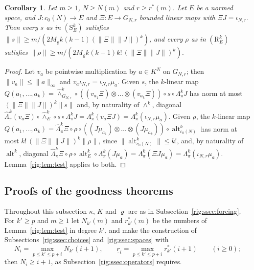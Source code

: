 \documentclass[11pt]{amsart}
\newtheorem{corollary}[theorem]{Corollary}
\theoremstyle{definition}
\theoremstyle{remark}
\numberwithin{equation}{section}
\newcommand{\norm}[1]{\lVert #1\rVert}
\theoremstyle{plain}
\theoremstyle{definition}
\theoremstyle{plain}
\newcommand{\alt}{\operatorname{alt}}
\begin{document}
\begin{corollary}\label{rig:cor:readout}
Let $m\ge1$, $N\ge N(m)$ and $r\ge r^*(m)$. Let $E$ be a normed space, and $J\colon c_0(N)\to E$ and
$\Xi\colon E\to G_{N,r}$ bounded linear maps with $\Xi J=\iota_{N,r}$. Then every $s$ as in $(\mathrm S^k_E)$ satisfies
$\norm s\ge m/(2M_\varrho k(k-1)(\norm\Xi\norm J)^k)$, and every $\rho$ as in $(\mathrm R^k_E)$ satisfies
$\norm\rho\ge m/(2M_\varrho k(k-1)k!\,(\norm\Xi\norm J)^k)$.
\end{corollary}

\begin{proof}
Let $v_a$ be pointwise multiplication by $a\in K^N$ on $G_{N,r}$; then $\norm{v_a}\le\norm a_\infty$ and
$v_a\iota_{N,r}=\iota_{N,r}\mu_a$. Given $s$, the $k$\nobreakdash-linear map
$Q(a_1,\dots,a_k)=\widehat\wedge^k_{G_{N,r}}\circ((v_{a_1}\Xi)\otimes\dots\otimes(v_{a_k}\Xi))\circ s\circ\Lambda^k_\pi J$
has norm at most $(\norm\Xi\norm J)^k\norm s$ and, by naturality of $\wedge^k$, diagonal
$\widehat\Lambda^k_\pi(v_a\Xi)\circ\widehat\wedge^k_E\circ s\circ\Lambda^k_\pi J=\Lambda^k_\pi(v_a\Xi J)=\Lambda^k_\pi(\iota_{N,r}\mu_a)$.
Given $\rho$, the $k$\nobreakdash-linear map
$Q(a_1,\dots,a_k)=\widehat\Lambda^k_\pi\Xi\circ\rho\circ((J\mu_{a_1})\otimes\dots\otimes(J\mu_{a_k}))\circ\alt^k_{c_0(N)}$
has norm at most $k!\,(\norm\Xi\norm J)^k\norm\rho$, since $\norm{\alt^k_{c_0(N)}}\le k!$, and, by naturality of
$\alt^k$, diagonal
$\widehat\Lambda^k_\pi\Xi\circ\rho\circ\alt^k_E\circ\Lambda^k_\pi(J\mu_a)=\Lambda^k_\pi(\Xi J\mu_a)=\Lambda^k_\pi(\iota_{N,r}\mu_a)$.
Lemma~\ref{rig:lem:test} applies to both.
\end{proof}

\subsection{Proofs of the goodness theorems}\label{rig:ssec:proofs}

Throughout this subsection $\kappa$, $K$ and $\varrho$ are as in Subsection~\ref{rig:ssec:forcing}. For $k'\ge p$ and
$m\ge1$ let $N_{k'}(m)$ and $r^*_{k'}(m)$ be the numbers of Lemma~\ref{rig:lem:test} in degree $k'$, and make the
construction of Subsections~\ref{rig:ssec:choices} and~\ref{rig:ssec:spaces} with
\begin{equation}\label{rig:eq:choices}
 N_i=\max_{p\le k'\le p+i}N_{k'}(i+1),\qquad\underline r_i=\max_{p\le k'\le p+i}r^*_{k'}(i+1)\qquad(i\ge0);
\end{equation}
then $N_i\ge i+1$, as Subsection~\ref{rig:ssec:operators} requires.
\end{document}
